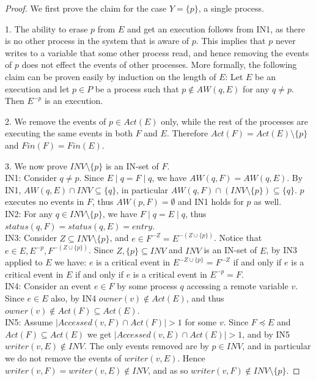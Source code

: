 \begin{proof}  \mbox{}
	
	We first prove the claim for the case $Y = \{p\}$, a single process.
	
	1. The ability to erase $p$ from $E$ and get an execution follows from IN1, as there is no other process in the system that is aware of $p$. This implies that $p$ never writes to a variable that some other process read, and hence removing the events of $p$ does not effect the events of other processes. More formally, the following claim can be proven easily by induction on the length of $E$:
	Let $E$ be an execution and let $p \in P$ be a process such that $p \notin AW(q,E)$ for any $q \neq p$. Then $E^{-p}$ is an execution.
	
	2. We remove the events of $p \in Act(E)$ only, while the rest of the processes are executing the same events in both $F$ and $E$. Therefore $Act(F) = Act(E) \setminus \{p\}$ and $Fin(F) = Fin(E)$.
	
	3. We now prove $INV \setminus \{p\}$ is an IN-set of $F$.
	\\ IN1: Consider $q \neq p$. Since $E \mid q = F \mid q$, we have $AW(q,F) = AW(q,E)$. By IN1, $AW(q,E) \cap INV \subseteq \{q\}$, in particular $AW(q,F) \cap (INV \setminus \{p\}) \subseteq \{q\}$. $p$ executes no events in $F$, thus $AW(p,F) = \emptyset$ and IN1 holds for $p$ as well.
	\\ IN2: For any $q \in INV \setminus \{p\}$, we have $F \mid q = E \mid q$, thus $status(q,F) = status(q,E) = entry$.	
	\\ IN3: Consider $Z \subseteq INV \setminus \{p\}$, and $e \in F^{-Z} = E^{-(Z \cup \{p\})}$. Notice that $e \in E, E^{-p}, F^{-(Z \cup \{p\})}$.  Since $Z, \{p\} \subseteq INV$ and $INV$ is an IN-set of $E$, by IN3 applied to $E$ we have: $e$ is a critical event in $E^{-Z \cup \{p\}} = F^{-Z}$ if and only if $e$ is a critical event in $E$ if and only if $e$ is a critical event in $E^{-p} = F$.
	\\ IN4: Consider an event $e \in F$ by some process $q$ accessing a remote variable $v$. Since $e \in E$ also, by IN4 $owner(v) \notin Act(E)$, and thus $owner(v) \notin Act(F) \subseteq Act(E)$.
	\\ IN5: Assume $|Accessed(v,F) \cap Act(F)| > 1$ for some $v$. Since $F \preceq E$ and $Act(F) \subseteq Act(E)$ we get $|Accessed(v,E) \cap Act(E)| > 1$, and by IN5 $writer(v,E) \notin INV$. The only events removed are by $p \in INV$, and in particular we do not remove the events of $writer(v,E)$. Hence $writer(v,F) = writer(v,E) \notin INV$, and as so $writer(v,F) \notin INV \setminus \{p\}$.
	

\end{proof}
